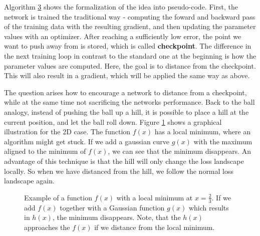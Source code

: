 Algorithm \hyperlink{alg:Distancing}{3} shows the formalization of the idea into
pseudo-code. First, the network is trained the traditional way - computing the
foward and backward pass of the training data with the resulting gradient, and
then updating the parameter values with an optimizer. After reaching a
sufficiently low error, the point we want to push away from is stored, which is
called \textbf{checkpoint}. The difference in the next training loop in contrast
to the standard one at the beginning is how the parameter values are computed.
Here, the goal is to distance from the checkpoint. This will also result in a
gradient, which will be applied the same way as above.

The question arises how to encourage a network to distance from a checkpoint,
while at the same time not sacrificing the networks performance. Back to the
ball analogy, instead of pushing the ball up a hill, it is possible to place a
hill at the current position, and let the ball roll down. Figure
\ref{fig:Distance2D} shows a graphical illustration for the 2D case. The
function $f(x)$ has a local minimum, where an algorithm might get stuck. If we
add a gaussian curve $g(x)$ with the maximum aligned to the minimum of $f(x)$,
we can see that the minimum disappears. An advantage of this technique is that
the hill will only change the loss landscape locally. So when we have distanced
from the hill, we follow the normal loss landscape again.

\begin{figure}[h!]
    \begin{center}
        \caption{Example of a function $f(x)$ with a local minimum at $x=\frac{2}{3}$. If we add $f(x)$ together with a Gaussian function $g(x)$ which results in $h(x)$, the minimum disappears. Note, that the $h(x)$ approaches the $f(x)$ if we distance from the local minimum.}
        \label{fig:Distance2D}
    \end{center}
\end{figure}

